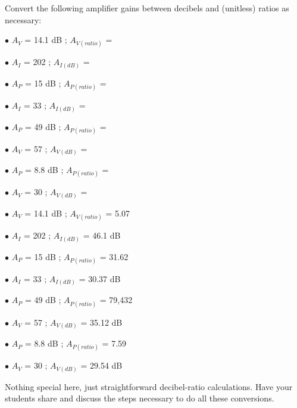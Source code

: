 

Convert the following amplifier gains between decibels and (unitless) ratios as necessary:

\medskip
\goodbreak
\item{$\bullet$} $A_V$ = 14.1 dB ; $A_{V(ratio)}$ = 
\item{$\bullet$} $A_I$ = 202 ; $A_{I(dB)}$ = 
\item{$\bullet$} $A_P$ = 15 dB ; $A_{P(ratio)}$ = 
\item{$\bullet$} $A_I$ = 33 ; $A_{I(dB)}$ = 
\item{$\bullet$} $A_P$ = 49 dB ; $A_{P(ratio)}$ = 
\item{$\bullet$} $A_V$ = 57 ; $A_{V(dB)}$ = 
\item{$\bullet$} $A_P$ = 8.8 dB ; $A_{P(ratio)}$ = 
\item{$\bullet$} $A_V$ = 30 ; $A_{V(dB)}$ = 
\medskip







\medskip
\goodbreak
\item{$\bullet$} $A_V$ = 14.1 dB ; $A_{V(ratio)}$ = 5.07
\item{$\bullet$} $A_I$ = 202 ; $A_{I(dB)}$ = 46.1 dB
\item{$\bullet$} $A_P$ = 15 dB ; $A_{P(ratio)}$ = 31.62
\item{$\bullet$} $A_I$ = 33 ; $A_{I(dB)}$ = 30.37 dB
\item{$\bullet$} $A_P$ = 49 dB ; $A_{P(ratio)}$ = 79,432
\item{$\bullet$} $A_V$ = 57 ; $A_{V(dB)}$ = 35.12 dB
\item{$\bullet$} $A_P$ = 8.8 dB ; $A_{P(ratio)}$ = 7.59
\item{$\bullet$} $A_V$ = 30 ; $A_{V(dB)}$ = 29.54 dB
\medskip







Nothing special here, just straightforward decibel-ratio calculations.  Have your students share and discuss the steps necessary to do all these conversions.




